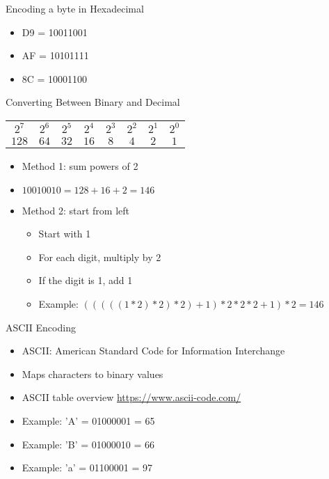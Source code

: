 \begin{withoutheadline}
\begin{frame}{Encoding a byte in Hexadecimal}
\begin{itemize}
    \item D9 = 10011001
    \item AF = 10101111
    \item 8C = 10001100
\end{itemize}
\end{frame}

\begin{frame}{Converting Between Binary and Decimal}
\begin{tabular}{c|c|c|c|c|c|c|c}
    $2^7$ & $2^6$ & $2^5$ & $2^4$ & $2^3$ & $2^2$ & $2^1$ & $2^0$ \\
    $128$ & $64$  & $32$  & $16$  & $8$   & $4$   & $2$   & $1$   \\
\end{tabular}

\begin{itemize}
    \item Method 1: sum powers of 2
    \item $10010010 = 128 + 16 + 2 = 146$
    \item Method 2: start from left
    \begin{itemize}
        \item Start with 1
        \item For each digit, multiply by 2
        \item If the digit is 1, add 1
        \item Example: $(((((1 * 2) * 2) * 2) + 1) * 2 * 2 * 2 + 1) * 2 = 146$
    \end{itemize}
\end{itemize}
\end{frame}

\begin{frame}{ASCII Encoding}
\begin{itemize}
    \item ASCII: American Standard Code for Information Interchange
    \item Maps characters to binary values
    \item ASCII table overview \url{https://www.ascii-code.com/}
    \item Example: 'A' = 01000001 = 65
    \item Example: 'B' = 01000010 = 66
    \item Example: 'a' = 01100001 = 97
\end{itemize}
\end{frame}


\end{withoutheadline}
